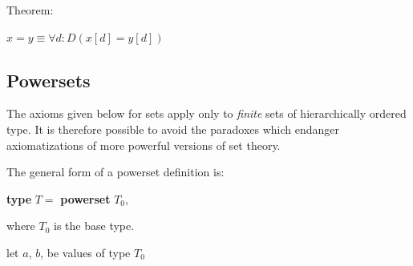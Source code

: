 \documentclass[twoside,11pt]{book}
\begin{document}
\noindent
Theorem:

$x = y \equiv \forall d:D(x[d] = y[d])$

\subsection{Powersets}

The axioms given below for sets apply only to \textit{finite} sets of hierarchically ordered type. It is therefore possible to avoid the paradoxes which endanger axiomatizations of more powerful versions of set theory.

The general form of a powerset definition is:

\quad \textbf{type} $T =$ \textbf{powerset} $T_0$,

\noindent
where $T_0$ is the base type.

\noindent
let $a$, $b$, be values of type $T_0$
\end{document}
